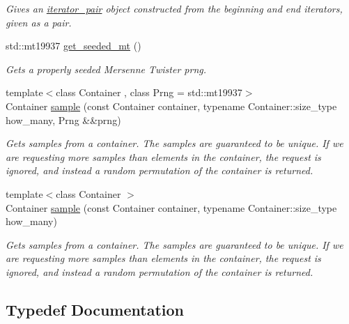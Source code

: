 \begin{DoxyCompactItemize}
\begin{DoxyCompactList}\small\item\em Gives an \hyperlink{classas_1_1iterator__pair}{iterator\+\_\+pair} object constructed from the beginning and end iterators, given as a pair. \end{DoxyCompactList}\item 
std\+::mt19937 \hyperlink{namespaceas_a4c9b0919bddf60796e9cc81ecd7d5bb2}{get\+\_\+seeded\+\_\+mt} ()
\begin{DoxyCompactList}\small\item\em Gets a properly seeded Mersenne Twister prng. \end{DoxyCompactList}\item 
{\footnotesize template$<$class Container , class Prng  = std\+::mt19937$>$ }\\Container \hyperlink{namespaceas_a001b8303767234a8c93de5cb530a8f3d}{sample} (const Container container, typename Container\+::size\+\_\+type how\+\_\+many, Prng \&\&prng)
\begin{DoxyCompactList}\small\item\em Gets samples from a container. The samples are guaranteed to be unique. If we are requesting more samples than elements in the container, the request is ignored, and instead a random permutation of the container is returned. \end{DoxyCompactList}\item 
{\footnotesize template$<$class Container $>$ }\\Container \hyperlink{namespaceas_ab2b3e64b4dee388f0ec34e41ae0b3e98}{sample} (const Container container, typename Container\+::size\+\_\+type how\+\_\+many)
\begin{DoxyCompactList}\small\item\em Gets samples from a container. The samples are guaranteed to be unique. If we are requesting more samples than elements in the container, the request is ignored, and instead a random permutation of the container is returned. \end{DoxyCompactList}\end{DoxyCompactItemize}


\subsection{Typedef Documentation}
\mbox{\label{namespaceas_a9bd788709567003423247a9db4ba1074}} 
